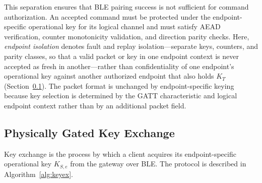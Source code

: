 \documentclass[journal]{IEEEtran}
\begin{document}
This separation ensures that BLE pairing success is not sufficient for command authorization. An accepted command must be protected under the endpoint-specific operational key for its logical channel and must satisfy AEAD verification, counter monotonicity validation, and direction parity checks. Here, \emph{endpoint isolation} denotes fault and replay isolation---separate keys, counters, and parity classes, so that a valid packet or key in one endpoint context is never accepted as fresh in another---rather than confidentiality of one endpoint's operational key against another authorized endpoint that also holds $K_T$ (Section~\ref{sec:keyexchange}). The packet format is unchanged by endpoint-specific keying because key selection is determined by the GATT characteristic and logical endpoint context rather than by an additional packet field.

\subsection{Physically Gated Key Exchange}
\label{sec:keyexchange}

Key exchange is the process by which a client acquires its endpoint-specific operational key $K_{S,e}$ from the gateway over BLE. The protocol is described in
Algorithm~\ref{alg:keyex}.
\end{document}
